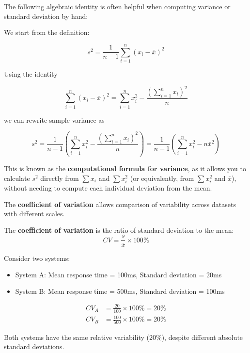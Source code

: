 The following algebraic identity is often helpful when computing variance or standard deviation by hand:

We start from the definition:

\[
s^2 = \frac{1}{n-1}\sum_{i=1}^n (x_i - \bar{x})^2
\]

Using the identity

\[
\sum_{i=1}^n (x_i - \bar{x})^2 = \sum_{i=1}^n x_i^2 - \frac{\left(\sum_{i=1}^n x_i \right)^2}{n}
\]

we can rewrite sample variance as

\[
s^2 = \frac{1}{n-1} \left( \sum_{i=1}^n x_i^2 - \frac{\left(\sum_{i=1}^n x_i\right)^2}{n} \right) =\frac{1}{n-1}\left(\sum_{i=1}^n x_i^2-n \bar{x}^2\right)
\]

This is known as the \textbf{computational formula for variance}, as it allows you to calculate $s^2$ directly from $\sum x_i$ and $\sum x_i^2$ (or equivalently, from $\sum x_i^2$ and $\bar{x}$), without needing to compute each individual deviation from the mean.


The \textbf{coefficient of variation} allows comparison of variability across datasets with different scales.

\begin{definition}
The \textbf{coefficient of variation} is the ratio of standard deviation to the mean:
\[
CV = \frac{s}{\bar{x}} \times 100\%
\]
\end{definition}

\begin{example}\par

Consider two systems:
\begin{itemize}
    \item System A: Mean response time = 100ms, Standard deviation = 20ms
    \item System B: Mean response time = 500ms, Standard deviation = 100ms
\end{itemize}

\begin{align*}
CV_A &= \frac{20}{100} \times 100\% = 20\% \\
CV_B &= \frac{100}{500} \times 100\% = 20\%
\end{align*}

Both systems have the same relative variability (20\%), despite different absolute standard deviations.
\end{example}

